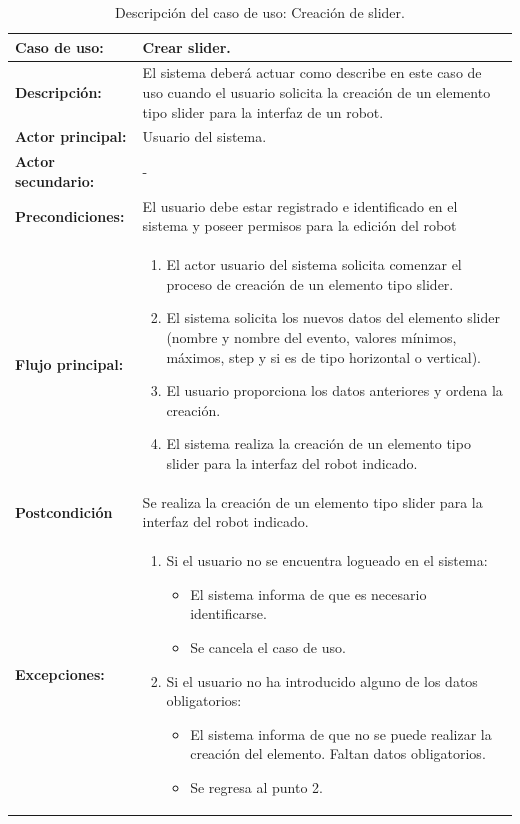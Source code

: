 




\begin{table}[H]
  \begin{center}
    \begin{tabular}{|p{3.5cm}|p{10cm}|}
      \hline
      {\textbf{Caso de uso:}} & { Crear slider.} \\
      \hline
      {\textbf{Descripción:}} & { El sistema deberá actuar como describe en este caso de uso cuando el usuario solicita la creación de un elemento tipo slider para la interfaz de un robot.} \\
     \hline
      {\textbf{Actor principal:}} & { Usuario del sistema.} \\
      \hline
      {\textbf{Actor secundario:}} & { - } \\
      \hline
      {\textbf{Precondiciones:}} & { El usuario debe estar registrado e identificado en el sistema y poseer permisos para la edición del robot } \\
     \hline   
    {\textbf{Flujo principal:}} & { 
      \begin{enumerate}
	\item El actor usuario del sistema solicita comenzar el proceso de creación de un elemento tipo slider.
	\item El sistema solicita los nuevos datos del elemento slider (nombre y nombre del evento, valores mínimos, máximos, step y si es de tipo horizontal o vertical).
	\item El usuario proporciona los datos anteriores y ordena la creación.
	\item El sistema realiza la creación de un elemento tipo slider para la interfaz del robot indicado.
      \end{enumerate}
      } \\
     \hline
     {\textbf{Postcondición}} & {Se realiza la creación de un elemento tipo slider para la interfaz del robot indicado.}\\
     \hline
      {\textbf{Excepciones:}} & {
	\begin{enumerate}
	\item Si el usuario no se encuentra logueado en el sistema:
	\begin{itemize}
	  \item El sistema informa de que es necesario identificarse.
	  \item Se cancela el caso de uso.
	\end{itemize}
	\item Si el usuario no ha introducido alguno de los datos obligatorios:
	  \begin{itemize}
	    \item El sistema informa de que no se puede realizar la creación del elemento. Faltan datos obligatorios.
	    \item Se regresa al punto 2.
	  \end{itemize}
	\end{enumerate}
	}\\
      \hline
    \end{tabular}
  \end{center}
\caption{Descripción del caso de uso: Creación de slider.}
\end{table}


